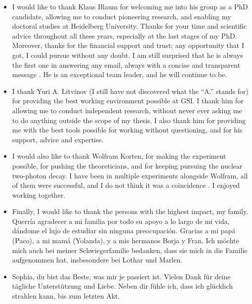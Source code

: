 \begin{itemize}
        \item I would like to thank Klaus Blaum for welcoming me into his group as a PhD candidate, allowing me to conduct pioneering research, and enabling my doctoral studies at Heidelberg University. Thanks for your time and scientific advice throughout all these years, especially at the last stages of my PhD. 
        Moreover, thanks for the financial support and trust; any opportunity that I got, I could pursue without any doubt. I am still surprised that he is always the first one in answering any email, always with a concise and transparent message \faGrin*[regular]. He is an exceptional team leader, and he will continue to be.
        \item I thank Yuri A. Litvinov (I still have not discovered what the ``A.'' stands for) for providing the best working environment possible at \textsc{GSI}. I thank him for allowing me to conduct independent research, without never ever asking me to do anything outside the scope of my thesis. I also thank him for providing me with the best tools possible for working without questioning, and for his support, advice and expertise.
        \item I would also like to thank Wolfram Korten, for making the experiment possible, for pushing the theoreticians, and for keeping pursuing the nuclear two-photon decay. I have been in multiple experiments alongside Wolfram, all of them were successful, and I do not think it was a coincidence \faGrinWink[regular]. I enjoyed working together.
        \item Finally, I would like to thank the persons with the highest impact, my family. Querría agradecer a mi familia por todo su apoyo a lo largo de mi vida, dándome el lujo de estudiar sin ninguna preocupación. Gracias a mi papá (Paco), a mi mamá (Yolanda), y a mis hermanos Borja y Fran. Ich möchte mich auch bei meiner Schwiegerfamilie bedanken, dass sie mich in die Familie aufgenommen hat, insbesondere bei Lothar und Marlen.
        \item[\faHeart] Sophia, du bist das Beste, was mir je passiert ist. Vielen Dank für deine tägliche Unterstützung und Liebe. Neben dir fühle ich, dass ich glücklich strahlen kann, bis zum letzten Akt.
    \end{itemize}

